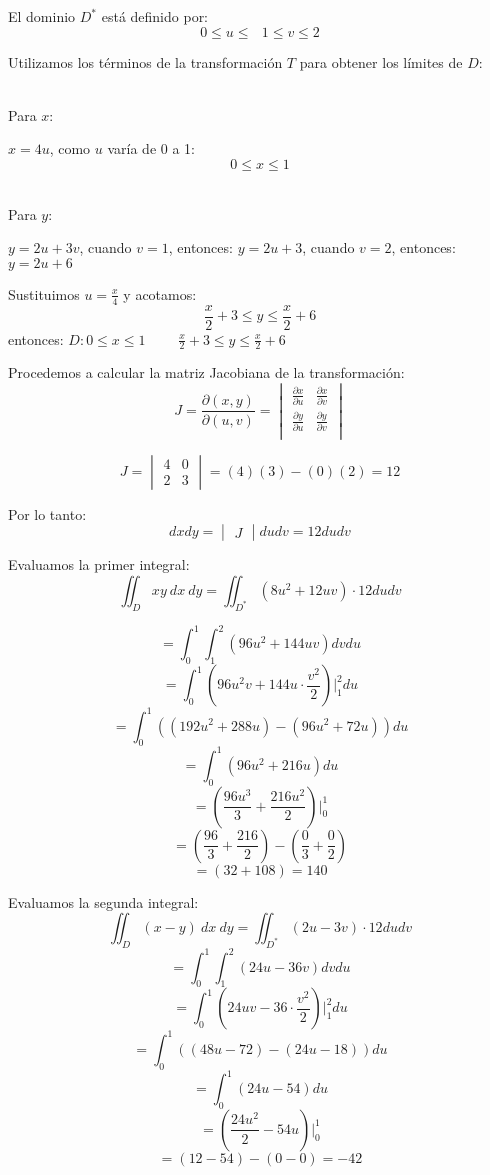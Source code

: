 El dominio $D^*$ está definido por:
$$0 \leq u \leq \ \ \  1 \leq v \leq 2$$

Utilizamos los términos de la transformación $T$ para obtener los límites de $D$:

\vspace{0.2cm}

\\Para $x$:

$x = 4u$, como $u$ varía de 0 a 1:
$$0 \leq x \leq 1$$

\vspace{0.2cm}

\\Para $y$:

$y = 2u + 3v$, cuando $v = 1$, entonces: $y = 2u + 3$, cuando $v = 2$, entonces: $y= 2u + 6$

Sustituimos $u = \frac{x}{4}$ y acotamos:
$$\frac{x}{2} + 3 \leq y \leq \frac{x}{2} + 6$$
entonces: $D: 0 \leq x \leq 1$ \ \ \ \ $\frac{x}{2} + 3 \leq y \leq \frac{x}{2} + 6$

Procedemos a calcular la matriz Jacobiana de la transformación:
$$J = \frac{\partial(x,y)}{\partial(u,v)} = \begin{vmatrix}
    \frac{\partial x}{\partial u} & \frac{\partial x}{\partial v}\\
\frac{\partial y}{\partial u} & \frac{\partial y}{\partial v}\\
\end{vmatrix}$$

$$J = \begin{vmatrix}
4 & 0\\
2 & 3
\end{vmatrix} = (4)(3) - (0)(2) = 12$$

Por lo tanto: $$dxdy = \begin{vmatrix}
J
\end{vmatrix} dudv = 12dudv$$

Evaluamos la primer integral:
$$\iint_D xy \ dx \ dy = \iint_{D^*} (8u^2 + 12uv) \cdot 12dudv$$

$$= \int_{0}^{1}\int_{1}^{2} (96u^2 + 144uv)dvdu$$
$$= \int_{0}^{1}(96u^2v + 144u \cdot \frac{v^2}{2}) \Big|_1^2 du$$
$$= \int_{0}^{1}((192u^2 + 288u) - (96u^2 + 72u)) du$$
$$= \int_{0}^{1}(96u^2 + 216u) du$$
$$= (\frac{96u^3}{3} + \frac{216u^2}{2}) \Big|_0^1$$
$$= (\frac{96}{3} + \frac{216}{2}) - (\frac{0}{3} + \frac{0}{2})$$
$$= (32 + 108) = 140$$

\vspace{0.3cm}

Evaluamos la segunda integral:
$$\iint_D (x - y) \ dx \ dy = \iint_{D^*} (2u - 3v) \cdot 12dudv$$
$$= \int_{0}^{1}\int_{1}^{2} (24u - 36v)dvdu$$
$$= \int_{0}^{1}(24uv - 36 \cdot \frac{v^2}{2}) \Big|_1^2 du$$
$$= \int_{0}^{1}((48u - 72) - (24u -18)) du$$
$$= \int_{0}^{1}(24u - 54) du$$
$$= (\frac{24u^2}{2} - 54u) \Big|_0^1$$
$$= (12 - 54) - (0 - 0) = -42$$

